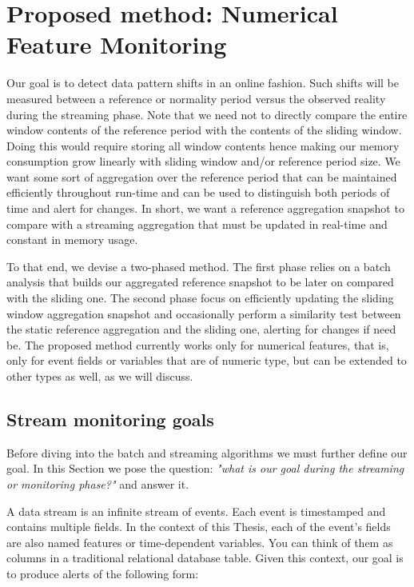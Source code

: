 \section{Proposed method: Numerical Feature Monitoring}

Our goal is to detect data pattern shifts in an online fashion. Such shifts will be measured between a reference or normality period versus the observed reality during the streaming phase. Note that we need not to directly compare the entire window contents of the reference period with the contents of the sliding window. Doing this would require storing all window contents hence making our memory consumption grow linearly with sliding window and/or reference period size. We want some sort of aggregation over the reference period that can be maintained efficiently throughout run-time and can be used to distinguish both periods of time and alert for changes. In short, we want a reference aggregation snapshot to compare with a streaming aggregation that must be updated in real-time and constant in memory usage.

To that end, we devise a two-phased method. The first phase relies on a batch analysis that builds our aggregated reference snapshot to be later on compared with the sliding one. The second phase focus on efficiently updating the sliding window aggregation snapshot and occasionally perform a similarity test between the static reference aggregation and the sliding one, alerting for changes if need be. The proposed method currently works only for numerical features, that is, only for event fields or variables that are of numeric type, but can be extended to other types as well, as we will discuss.

\subsection{Stream monitoring goals}
Before diving into the batch and streaming algorithms we must further define our goal. In this Section we pose the question: \textit{"what is our goal during the streaming or monitoring phase?"} and answer it.

A data stream is an infinite stream of events. Each event is timestamped and contains multiple fields. In the context of this Thesis, each of the event's fields are also named features or time-dependent variables. You can think of them as columns in a traditional relational database table. Given this context, our goal is to produce alerts of the following form:


